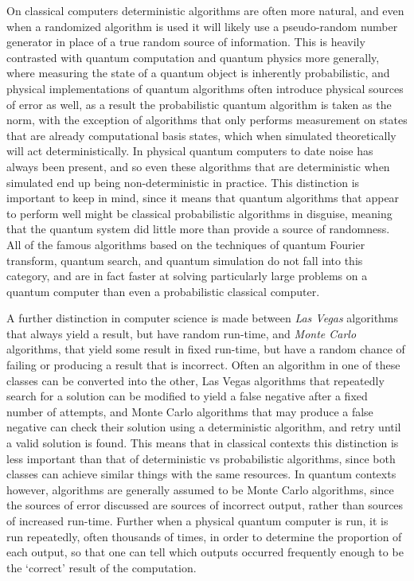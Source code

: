 On classical computers deterministic algorithms are often more natural, and even when a randomized algorithm is used it will likely use a pseudo-random number generator in place of a true random source of information. This is heavily contrasted with quantum computation and quantum physics more generally, where measuring the state of a quantum object is inherently probabilistic, and physical implementations of quantum algorithms often introduce physical sources of error as well, as a result the probabilistic quantum algorithm is taken as the norm, with the exception of algorithms that only performs measurement on states that are already computational basis states, which when simulated theoretically will act deterministically. In physical quantum computers to date noise has always been present, and so even these algorithms that are deterministic when simulated end up being non-deterministic in practice. This distinction is important to keep in mind, since it means that quantum algorithms that appear to perform well might be classical probabilistic algorithms in disguise, meaning that the quantum system did little more than provide a source of randomness. All of the famous algorithms based on the techniques of quantum Fourier transform, quantum search, and quantum simulation do not fall into this category, and are in fact faster at solving particularly large problems on a quantum computer than even a probabilistic classical computer.

A further distinction in computer science is made between \emph{Las Vegas} algorithms that always yield a result, but have random run-time, and \emph{Monte Carlo} algorithms, that yield some result in fixed run-time, but have a random chance of failing or producing a result that is incorrect. Often an algorithm in one of these classes can be converted into the other, Las Vegas algorithms that repeatedly search for a solution can be modified to yield a false negative after a fixed number of attempts, and Monte Carlo algorithms that may produce a false negative can check their solution using a deterministic algorithm, and retry until a valid solution is found. This means that in classical contexts this distinction is less important than that of deterministic vs probabilistic algorithms, since both classes can achieve similar things with the same resources. In quantum contexts however, algorithms are generally assumed to be Monte Carlo algorithms, since the sources of error discussed are sources of incorrect output, rather than sources of increased run-time. Further when a physical quantum computer is run, it is run repeatedly, often thousands of times, in order to determine the proportion of each output, so that one can tell which outputs occurred frequently enough to be the `correct' result of the computation.

